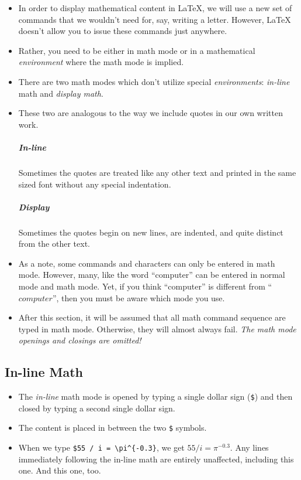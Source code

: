 \begin{itemize}

\item In order to display mathematical content in \LaTeX{}, we will use a
  new set of commands that we wouldn't need for, say, writing a
  letter. However, \LaTeX{} doesn't allow you to issue these commands
  just anywhere.

\item Rather, you need to be either in math mode or in a
  mathematical \textit{environment} where the math mode is implied.

\item There are two math modes which don't utilize special
  \textit{environments}: \textit{in-line} math and \textit{display
    math}.

\item These two are analogous to the way we include quotes in our own written
  work. \subparagraph{In-line} Sometimes the quotes are treated like any other
  text and printed in the same sized font without any special
  indentation. \subparagraph{Display} Sometimes the quotes begin on new lines,
  are indented, and quite distinct from the other text.

\item As a note, some commands and characters can only be entered in math
  mode. However, many, like the word ``computer'' can be entered in normal mode
  and math mode. Yet, if you think ``computer'' is different from
  ``$computer$'', then you must be aware which mode you use.

\item After this section, it will be assumed that all math command sequence are
  typed in math mode. Otherwise, they will almost always fail. {\large
    \textit{The math mode openings and closings are omitted!}}

\end{itemize}

\subsection*{In-line Math}
\begin{itemize}
\item The \textit{in-line} math mode is opened by typing a single dollar sign
  (\verb=$=) and then closed by typing a second single dollar sign.

\item The content is placed in between the two \verb=$= symbols.

\item When we type \verb!$55 / i = \pi^{-0.3}!, we get $55/i = \pi^{-0.3}$. Any
  lines immediately following the in-line math are entirely unaffected,
  including this one. And this one, too.
\end{itemize}

